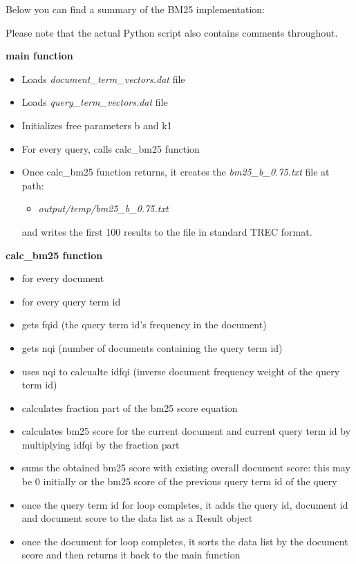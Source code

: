 \documentclass{article} %
\begin{document}
Below you can find a summary of the BM25 implementation:

Please note that the actual Python script also contains comments throughout.

\textbf{main function}

\begin{itemize}
    \item Loads \textit{document\_term\_vectors.dat} file
    \item Loads \textit{query\_term\_vectors.dat} file
    \item Initializes free parameters b and k1
    \item For every query, calls calc\_bm25 function
    \item Once calc\_bm25 function returns, it creates the \textit{bm25\_b\_0.75.txt} file at path:
    \begin{itemize}
        \item \textit{output/temp/bm25\_b\_0.75.txt}    
    \end{itemize}
    and writes the first 100 results to the file in standard TREC format.
\end{itemize}


\textbf{calc\_bm25 function}

\begin{itemize}
    \item for every document
    \item for every query term id
    \item gets fqid (the query term id's frequency in the document)
    \item gets nqi (number of documents containing the query term id)
    \item uses nqi to calcualte idfqi (inverse document frequency weight of the query term id)
    \item calculates fraction part of the bm25 score equation
    \item calculates bm25 score for the current document and current query term id by multiplying idfqi by the fraction part
    \item sums the obtained bm25 score with existing overall document score: this may be 0 initially or the bm25 score of the previous query term id of the query
    \item once the query term id for loop completes, it adds the query id, document id and document score to the data list as a Result object
    \item once the document for loop completes, it sorts the data list by the document score and then returns it back to the main function
\end{itemize}
\end{document}
